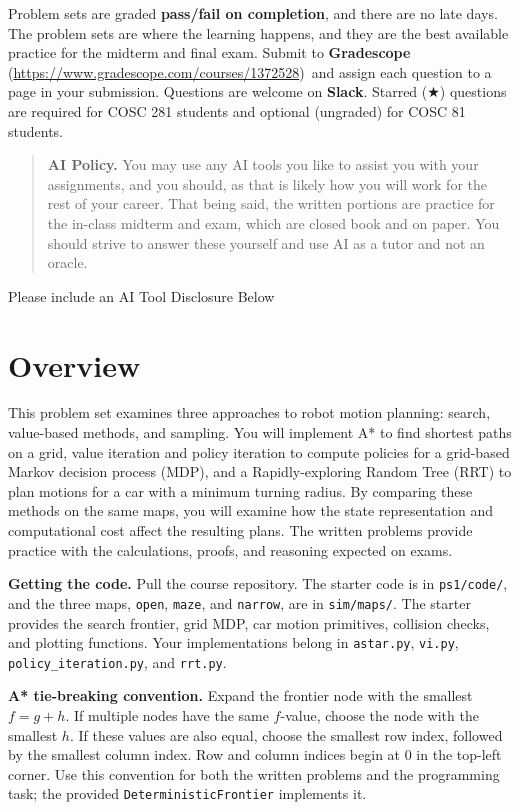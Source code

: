 \documentclass[11pt]{article}
\title{\textbf{\coursenumber:} #1}
\author{\textbf{Due} #2\\
  }
\date{}
\newcommand{\heur}{h}                   %
\newcommand{\ctg}{g}                    %
\newcommand{\dgreen}[1]{\textcolor{DartmouthGreen}{#1}}
\newcommand{\dgbf}[1]{\textbf{\dgreen{#1}}}      %
\newcommand{\gradescopelink}{\textbf{Gradescope} (\url{https://www.gradescope.com/courses/1372528})}
\DeclareRobustCommand{\callout}[2][gray!10]{%
  \begin{tcolorbox}[left=8pt, arc=0pt, outer arc=0pt,
                    colframe=#1, colback=#1, coltext=black]#2\end{tcolorbox}}
\newcommand{\coursenotice}{%
  \callout{Problem sets are graded \textbf{pass/fail on completion}, and
  there are no late days. The problem sets are where the learning happens,
  and they are the best available practice for the midterm and final exam.
  Submit to \gradescopelink\ and assign each question to a page in your
  submission. Questions are welcome on \dgbf{Slack}. Starred ($\bigstar$)
  questions are required for COSC 281 students and optional (ungraded) for
  COSC 81 students.}}
\begin{document}
\maketitle
\coursenotice
\begin{quote}\small\textbf{AI Policy.} You may use any AI tools you like to assist you with your assignments, and you should, as that is likely how you will work for the rest of your career. 
That being said, the written portions are practice for the in-class midterm and exam, which are closed book and on paper. You should strive to answer these yourself and use AI as a tutor and not an oracle.
\end{quote}

\callout{Please include an AI Tool Disclosure Below \vspace{50pt}}

\raggedbottom
\section{Overview}

This problem set examines three approaches to robot motion planning:
search, value-based methods, and sampling. You will implement A* to find
shortest paths on a grid, value iteration and policy iteration to compute
policies for a grid-based Markov decision process (MDP), and a
Rapidly-exploring Random Tree (RRT) to plan motions for a car with a
minimum turning radius. By comparing these methods on the same maps,
you will examine how the state representation and computational cost
affect the resulting plans. The written problems provide practice with the calculations, proofs, and
reasoning expected on exams.

\clearpage
\textbf{Getting the code.} Pull the course repository. The starter code
is in \texttt{ps1/code/}, and the three maps, \texttt{open},
\texttt{maze}, and \texttt{narrow}, are in \texttt{sim/maps/}. The starter
provides the search frontier, grid MDP, car motion primitives, collision
checks, and plotting functions. Your implementations belong in
\texttt{astar.py}, \texttt{vi.py}, \texttt{policy\_iteration.py}, and
\texttt{rrt.py}.

\callout{\textbf{A* tie-breaking convention.} Expand the frontier node
with the smallest $f = \ctg + \heur$. If multiple nodes have the same
$f$-value, choose the node with the smallest $\heur$. If these values
are also equal, choose the smallest row index, followed by the smallest
column index. Row and column indices begin at 0 in the top-left corner.
Use this convention for both the written problems and the programming
task; the provided \texttt{DeterministicFrontier} implements it.}
\end{document}
